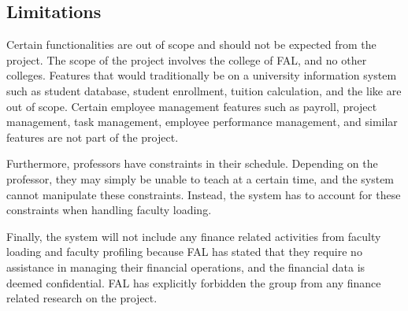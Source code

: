 \subsection{Limitations}
Certain functionalities are out of scope and should not be expected from the project. The scope of the project involves the college of FAL, and no other colleges. Features that would traditionally be on a university information system such as student database, student enrollment, tuition calculation, and the like are out of scope. Certain employee management features such as payroll, project management, task management, employee performance management, and similar features are not part of the project.

Furthermore, professors have constraints in their schedule. Depending on the professor, they may simply be unable to teach at a certain time, and the system cannot manipulate these constraints. Instead, the system has to account for these constraints when handling faculty loading.

Finally, the system will not include any finance related activities from faculty loading and faculty profiling because FAL has stated that they require no assistance in managing their financial operations, and the financial data is deemed confidential.  FAL has explicitly forbidden the group from any finance related research on the project.